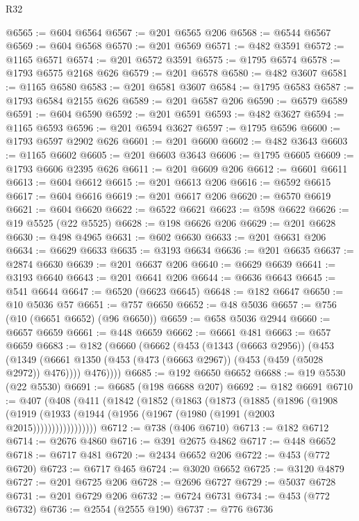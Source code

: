 \begin{lexlean}{R32}
\begin{coremodule}
@6565 := @604 @6564
@6567 := @201 @6565 @206
@6568 := @6544 @6567
@6569 := @604 @6568
@6570 := @201 @6569
@6571 := @482 @3591
@6572 := @1165 @6571
@6574 := @201 @6572 @3591
@6575 := @1795 @6574
@6578 := @1793 @6575 @2168 @626
@6579 := @201 @6578
@6580 := @482 @3607
@6581 := @1165 @6580
@6583 := @201 @6581 @3607
@6584 := @1795 @6583
@6587 := @1793 @6584 @2155 @626
@6589 := @201 @6587 @206
@6590 := @6579 @6589
@6591 := @604 @6590
@6592 := @201 @6591
@6593 := @482 @3627
@6594 := @1165 @6593
@6596 := @201 @6594 @3627
@6597 := @1795 @6596
@6600 := @1793 @6597 @2902 @626
@6601 := @201 @6600
@6602 := @482 @3643
@6603 := @1165 @6602
@6605 := @201 @6603 @3643
@6606 := @1795 @6605
@6609 := @1793 @6606 @2395 @626
@6611 := @201 @6609 @206
@6612 := @6601 @6611
@6613 := @604 @6612
@6615 := @201 @6613 @206
@6616 := @6592 @6615
@6617 := @604 @6616
@6619 := @201 @6617 @206
@6620 := @6570 @6619
@6621 := @604 @6620
@6622 := @6522 @6621
@6623 := @598 @6622
@6626 := @19 @5525 (@22 @5525)
@6628 := @198 @6626 @206
@6629 := @201 @6628
@6630 := @498 @4965
@6631 := @602 @6630
@6633 := @201 @6631 @206
@6634 := @6629 @6633
@6635 := @3193 @6634
@6636 := @201 @6635
@6637 := @2874 @6630
@6639 := @201 @6637 @206
@6640 := @6629 @6639
@6641 := @3193 @6640
@6643 := @201 @6641 @206
@6644 := @6636 @6643
@6645 := @541 @6644
@6647 := @6520 (@6623 @6645)
@6648 := @182 @6647
@6650 := @10 @5036 @57
@6651 := @757 @6650
@6652 := @48 @5036
@6657 := @756 (@10 (@6651 @6652) (@96 @6650))
@6659 := @658 @5036 @2944
@6660 := @6657 @6659
@6661 := @448 @6659
@6662 := @6661 @481
@6663 := @657 @6659
@6683 := @182
    (@6660
      (@6662
        (@453
          (@1343 (@6663 @2956))
          (@453
            (@1349 (@6661 @1350 (@453 (@473 (@6663 @2967)) (@453 (@459 (@5028 @2972)) @476))))
            @476))))
@6685 := @192 @6650 @6652
@6688 := @19 @5530 (@22 @5530)
@6691 := @6685 (@198 @6688 @207)
@6692 := @182 @6691
@6710 := @407
    (@408
      (@411
        (@1842
          (@1852
            (@1863
              (@1873
                (@1885
                  (@1896
                    (@1908
                      (@1919 (@1933 (@1944 (@1956 (@1967 (@1980 (@1991 (@2003 @2015)))))))))))))))))
@6712 := @738 (@406 @6710)
@6713 := @182 @6712
@6714 := @2676 @4860
@6716 := @391 @2675 @4862
@6717 := @448 @6652
@6718 := @6717 @481
@6720 := @2434 @6652 @206
@6722 := @453 (@772 @6720)
@6723 := @6717 @465
@6724 := @3020 @6652
@6725 := @3120 @4879
@6727 := @201 @6725 @206
@6728 := @2696 @6727
@6729 := @5037 @6728
@6731 := @201 @6729 @206
@6732 := @6724 @6731
@6734 := @453 (@772 @6732)
@6736 := @2554 (@2555 @190)
@6737 := @776 @6736

\end{coremodule}
\end{lexlean}
